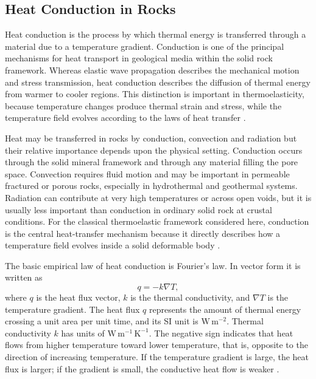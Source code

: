 \subsection{Heat Conduction in Rocks}

Heat conduction is the process by which thermal energy is transferred through a material due to a temperature gradient. Conduction is one of the principal mechanisms for heat transport in geological media within the solid rock framework. Whereas elastic wave propagation describes the mechanical motion and stress transmission, heat conduction describes the diffusion of thermal energy from warmer to cooler regions. This distinction is important in thermoelasticity, because temperature changes produce thermal strain and stress, while the temperature field evolves according to the laws of heat transfer \cite{robertson1988,turcotte2014}.

Heat may be transferred in rocks by conduction, convection and radiation but their relative importance depends upon the physical setting. Conduction occurs through the solid mineral framework and through any material filling the pore space. Convection requires fluid motion and may be important in permeable fractured or porous rocks, especially in hydrothermal and geothermal systems. Radiation can contribute at very high temperatures or across open voids, but it is usually less important than conduction in ordinary solid rock at crustal conditions. For the classical thermoelastic framework considered here, conduction is the central heat-transfer mechanism because it directly describes how a temperature field evolves inside a solid deformable body \cite{robertson1988,turcotte2014}.

The basic empirical law of heat conduction is Fourier's law. In vector form it is written as
\begin{equation}
q = -k \nabla T,
\end{equation}
where \(q\) is the heat flux vector, \(k\) is the thermal conductivity, and \(\nabla T\) is the temperature gradient. The heat flux \(q\) represents the amount of thermal energy crossing a unit area per unit time, and its SI unit is \(\mathrm{W\,m^{-2}}\). Thermal conductivity \(k\) has units of \(\mathrm{W\,m^{-1}\,K^{-1}}\). The negative sign indicates that heat flows from higher temperature toward lower temperature, that is, opposite to the direction of increasing temperature. If the temperature gradient is large, the heat flux is larger; if the gradient is small, the conductive heat flow is weaker \cite{robertson1988,turcotte2014}.

